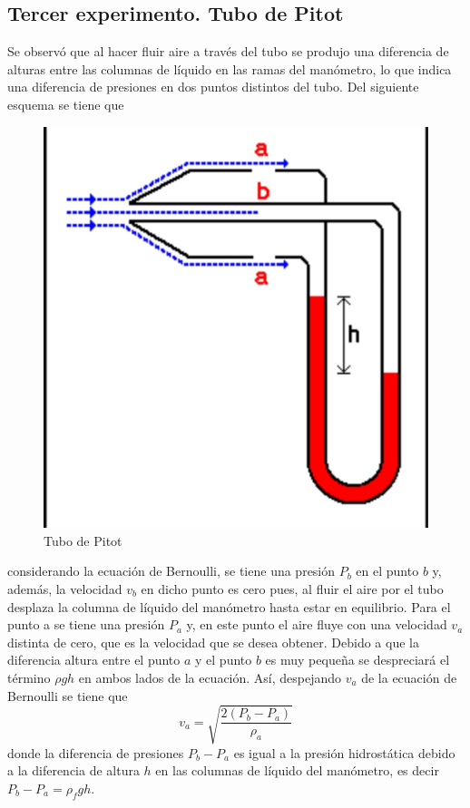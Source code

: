 \documentclass[10pt,a4paper]{article}
\begin{document}
\subsection*{Tercer experimento. Tubo de Pitot}
Se observó que al hacer fluir aire a través del tubo se produjo una diferencia de alturas entre las columnas de líquido en las ramas del manómetro, lo que indica una diferencia de presiones en dos puntos distintos del tubo. Del siguiente esquema se tiene que 
\begin{figure}[H]
\includegraphics[scale=0.09]{pitot.jpg}
\centering
\caption{Tubo de Pitot}
\end{figure}
considerando la ecuación de Bernoulli, se tiene una presión $P_b$ en el punto $b$ y, además, la velocidad $v_b$ en dicho punto es cero pues, al fluir el aire por el tubo desplaza la columna de líquido del manómetro hasta estar en equilibrio. Para el punto a se tiene una presión $P_a$ y, en este punto el aire fluye con una velocidad $v_a$ distinta de cero, que es la velocidad que se desea obtener.  
Debido a que la diferencia altura entre el punto $a$ y el punto $b$ es muy pequeña se despreciará el término $\rho g h$ en ambos lados de la ecuación. 
Así, despejando $v_a$ de la ecuación de Bernoulli se tiene que $$v_a =\sqrt{\frac{2(P_b - P_a)}{\rho_a}}$$ donde la diferencia de presiones $P_b - P_a$ es igual a la presión hidrostática debido a la diferencia de altura $h$ en las columnas de líquido del manómetro, es decir $P_b - P_a = \rho_f g h$.
\end{document}
